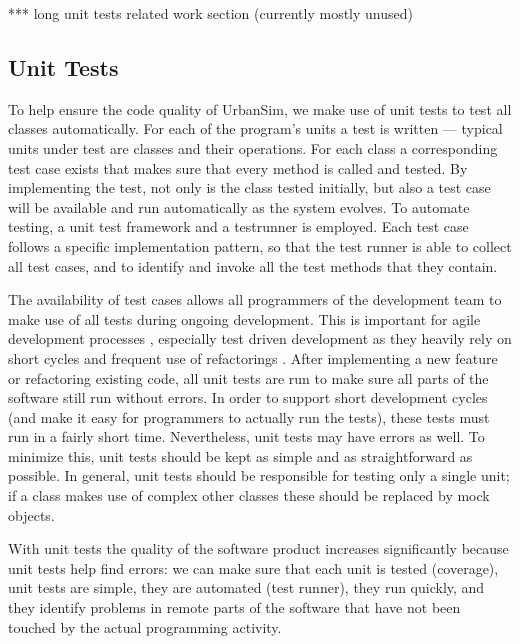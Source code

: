 
*** long unit tests related work section (currently mostly unused)

\subsection{Unit Tests}
\label{related-work-unit-tests}

To help ensure the code quality of UrbanSim, we make use of unit tests 
\cite{beckgamma,hunt:2003,Noonan:2002} to test all classes automatically. For 
each of the program's units a test is written --- typical units under test are 
classes and their operations.  For each class a corresponding test case exists 
that makes sure that every method is called and tested.  By implementing the 
test, not only is the class tested initially,
but also a test case will be available and run automatically as the system
evolves.  To automate testing, a unit test framework and a testrunner is 
employed.
Each test case follows a specific implementation pattern, so that the test
runner 
is able to collect all test cases, and to identify and invoke
all the test methods that they contain.

The availability of test cases allows all programmers of the development
team to make use of all tests during ongoing development.  This is important
for agile development processes \cite{cockburn:2001,highsmith:2002},
especially test driven development \cite{beck:2003} as they heavily
rely on short cycles and frequent use of refactorings \cite{fowler:2001}.
After implementing a new feature or refactoring existing code, all unit
tests are run to make sure all parts of the software still run without
errors. In order to support short development cycles (and make it easy for
programmers to actually run the tests), these tests must run in a fairly
short time.  Nevertheless, unit tests may have errors as well.  To minimize
this, unit tests should be kept as simple and as straightforward as
possible.  In general, unit tests should be 
responsible for testing only a single
unit; if a class makes use of complex other classes these 
should be replaced by mock objects.

With unit tests the quality of the software product increases significantly 
because unit tests help find errors: we can make sure that each unit is tested 
(coverage), unit tests are simple, they are automated (test runner), they run 
quickly, and 
they identify problems in remote parts of the software that have not 
been touched by the actual programming activity.

